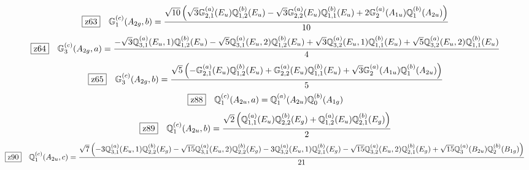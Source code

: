 \documentclass[fleqn,10pt,landscape]{jsarticle}
\begin{document}
\begin{dmath*}
\hspace*{3mm}\fbox{z63}\quad \mathbb{G}_{1}^{(c)}(A_{2g},b)=\frac{\sqrt{10} \left(\sqrt{3} \mathbb{G}_{2,1}^{(a)}(E_{u}) \mathbb{Q}_{1,2}^{(b)}(E_{u}) - \sqrt{3} \mathbb{G}_{2,2}^{(a)}(E_{u}) \mathbb{Q}_{1,1}^{(b)}(E_{u}) + 2 \mathbb{G}_{2}^{(a)}(A_{1u}) \mathbb{Q}_{1}^{(b)}(A_{2u})\right)}{10}
\end{dmath*}
\begin{dmath*}
\hspace*{3mm}\fbox{z64}\quad \mathbb{G}_{3}^{(c)}(A_{2g},a)=\frac{- \sqrt{3} \mathbb{Q}_{3,1}^{(a)}(E_{u},1) \mathbb{Q}_{1,2}^{(b)}(E_{u}) - \sqrt{5} \mathbb{Q}_{3,1}^{(a)}(E_{u},2) \mathbb{Q}_{1,2}^{(b)}(E_{u}) + \sqrt{3} \mathbb{Q}_{3,2}^{(a)}(E_{u},1) \mathbb{Q}_{1,1}^{(b)}(E_{u}) + \sqrt{5} \mathbb{Q}_{3,2}^{(a)}(E_{u},2) \mathbb{Q}_{1,1}^{(b)}(E_{u})}{4}
\end{dmath*}
\begin{dmath*}
\hspace*{3mm}\fbox{z65}\quad \mathbb{G}_{3}^{(c)}(A_{2g},b)=\frac{\sqrt{5} \left(- \mathbb{G}_{2,1}^{(a)}(E_{u}) \mathbb{Q}_{1,2}^{(b)}(E_{u}) + \mathbb{G}_{2,2}^{(a)}(E_{u}) \mathbb{Q}_{1,1}^{(b)}(E_{u}) + \sqrt{3} \mathbb{G}_{2}^{(a)}(A_{1u}) \mathbb{Q}_{1}^{(b)}(A_{2u})\right)}{5}
\end{dmath*}
\begin{dmath*}
\hspace*{3mm}\fbox{z88}\quad \mathbb{Q}_{1}^{(c)}(A_{2u},a)=\mathbb{Q}_{1}^{(a)}(A_{2u}) \mathbb{Q}_{0}^{(b)}(A_{1g})
\end{dmath*}
\begin{dmath*}
\hspace*{3mm}\fbox{z89}\quad \mathbb{Q}_{1}^{(c)}(A_{2u},b)=\frac{\sqrt{2} \left(\mathbb{Q}_{1,1}^{(a)}(E_{u}) \mathbb{Q}_{2,2}^{(b)}(E_{g}) + \mathbb{Q}_{1,2}^{(a)}(E_{u}) \mathbb{Q}_{2,1}^{(b)}(E_{g})\right)}{2}
\end{dmath*}
\begin{dmath*}
\hspace*{3mm}\fbox{z90}\quad \mathbb{Q}_{1}^{(c)}(A_{2u},c)=\frac{\sqrt{7} \left(- 3 \mathbb{Q}_{3,1}^{(a)}(E_{u},1) \mathbb{Q}_{2,2}^{(b)}(E_{g}) - \sqrt{15} \mathbb{Q}_{3,1}^{(a)}(E_{u},2) \mathbb{Q}_{2,2}^{(b)}(E_{g}) - 3 \mathbb{Q}_{3,2}^{(a)}(E_{u},1) \mathbb{Q}_{2,1}^{(b)}(E_{g}) - \sqrt{15} \mathbb{Q}_{3,2}^{(a)}(E_{u},2) \mathbb{Q}_{2,1}^{(b)}(E_{g}) + \sqrt{15} \mathbb{Q}_{3}^{(a)}(B_{2u}) \mathbb{Q}_{2}^{(b)}(B_{1g})\right)}{21}
\end{dmath*}
\end{document}
